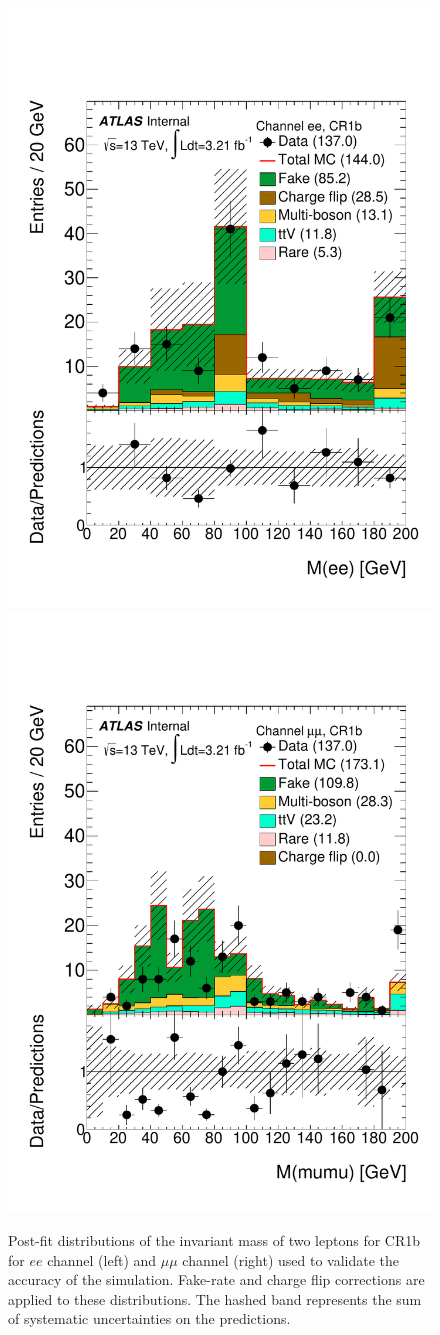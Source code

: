 \begin{figure}[htb]
\centering
 \includegraphics[width=.32\textwidth]{FIGURES/bckg_MC/SS3L/Fit/Mee_ee_CR1b_SS3L}
  \includegraphics[width=.32\textwidth]{FIGURES/bckg_MC/SS3L/Fit/Mmumu_mm_CR1b_SS3L}
\caption{
Post-fit distributions of the invariant mass of two leptons for CR1b for $ee$ channel (left) and $\mu\mu$ channel (right)  used to validate the accuracy of the simulation.
Fake-rate and charge flip corrections are applied to these distributions. The hashed band represents the sum of systematic uncertainties on the predictions.
\label{f:val_met_CR1b}
}
\end{figure}


